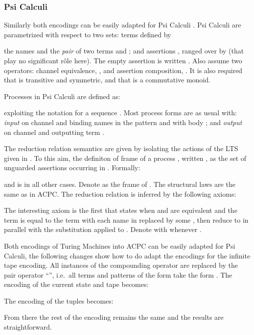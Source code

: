 \documentclass[submission,copyright,creativecommons]{eptcs}
\begin{document}
\subsubsection*{Psi Calculi}

\newcommand{\psiap}[2]{\underline{#1}(#2)}
\newcommand{\psoap}[2]{\overline {#1}(#2)}

Similarly both encodings can be easily adapted for Psi Calculi \cite{BJPV11}.
Psi Calculi are parametrized with respect to two sets: terms  defined by

the names  and the {\em pair}  of two terms  and ;
and assertions , ranged over by  (that play no significant r\^ole here).
The empty assertion is written .
Also assume two operators: channel equivalence, ,
and assertion composition, . 
It is also required that  is transitive and
symmetric, and that  is a commutative monoid.

Processes in Psi Calculi are defined as:

exploiting the notation  for a sequence .
Most process forms are as usual with:
{\em input}  on channel  and binding names  in the pattern 
and with body ;
and {\em output}  on channel  and outputting term .

The reduction relation semantics are given by
isolating the  actions of the LTS given in \cite{BJPV11}.
To this aim, the definiton of frame of a process , written ,
as the set of unguarded assertions occurring in . Formally:

and is  in all other cases. Denote as  the frame of .
The structural laws are the same as in ACPC.
The reduction relation is inferred by the following axioms:

The interesting axiom is the first that states when  and  are equivalent and
the term  is equal to the term  with each name in  replaced by some ,
then reduce to  in parallel with the substitution  applied to .
Denote with  whenever .



Both encodings of Turing Machines into ACPC can be easily adapted for Psi Calculi,
the following changes show how to do adapt the encodings for the infinite tape encoding.
All instances of the compounding operator  are replaced by the pair
operator ``'', i.e.~all terms and patterns of the form  take the form .
The encoding of the current state  and tape  becomes:

The encoding of the tuples becomes:

From there the rest of the encoding remains the same and the results are
straightforward.
\end{document}
